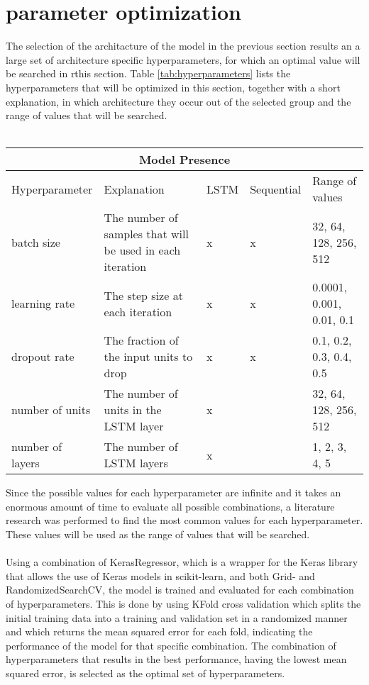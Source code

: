 \section{parameter optimization}
\label{sec:parameter_optimization}
The selection of the architacture of the model in the previous section results an a large set of architecture specific hyperparameters, for which an optimal value will be searched in rthis section. Table \ref{tab:hyperparameters} lists the hyperparameters that will be optimized in this section, together with a short explanation, in which architecture they occur out of the selected group and the range of values that will be searched.
\\ \\
\begin{table}[H]
\centering
\begin{tabular}{|l|l|l|l|l|}
\hline
\hline
\multicolumn{5}{|c|}{\textbf{Model Presence}} \\
\hline
Hyperparameter & Explanation & LSTM & Sequential & Range of values \\
\hline
\hline
batch size & The number of samples that will be used in each iteration & x & x & 32, 64, 128, 256, 512 \\
\hline
learning rate & The step size at each iteration & x & x & 0.0001, 0.001, 0.01, 0.1 \\
\hline
dropout rate & The fraction of the input units to drop & x & x & 0.1, 0.2, 0.3, 0.4, 0.5 \\
\hline
number of units & The number of units in the LSTM layer & x & & 32, 64, 128, 256, 512 \\
\hline
number of layers & The number of LSTM layers & x & & 1, 2, 3, 4, 5 \\
\hline
\hline
\end{tabular}
Since the possible values for each hyperparameter are infinite and it takes an enormous amount of time to evaluate all possible combinations, a literature research \cite[text]{keylist} was performed to find the most common values for each hyperparameter. These values will be used as the range of values that will be searched. 
\\ \\
Using a combination of KerasRegressor, which is a wrapper for the Keras library that allows the use of Keras models in scikit-learn, and both Grid- and RandomizedSearchCV, the model is trained and evaluated for each combination of hyperparameters. This is done by using KFold cross validation which splits the initial training data into a training and validation set in a randomized manner and which returns the mean squared error for each fold, indicating the performance of the model for that specific combination. The combination of hyperparameters that results in the best performance, having the lowest mean squared error, is selected as the optimal set of hyperparameters. 

\end{table}
